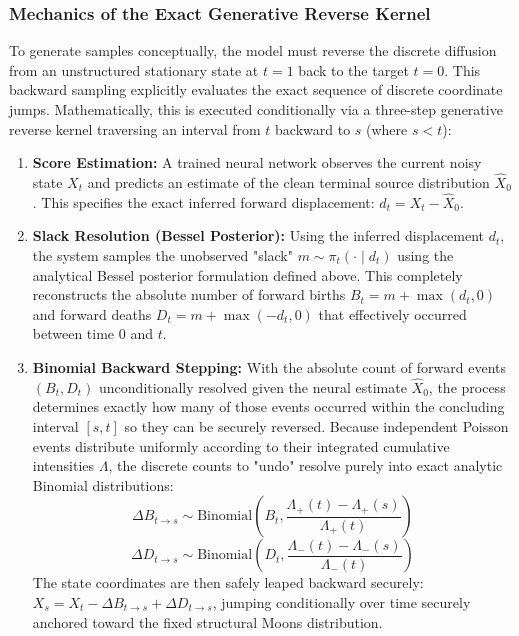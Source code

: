 \documentclass{article}
\begin{document}
\subsubsection*{Mechanics of the Exact Generative Reverse Kernel}
To generate samples conceptually, the model must reverse the discrete diffusion from an unstructured stationary state at \(t=1\) back to the target \(t=0\). This backward sampling explicitly evaluates the exact sequence of discrete coordinate jumps. Mathematically, this is executed conditionally via a three-step generative reverse kernel traversing an interval from \(t\) backward to \(s\) (where \(s < t\)):
\begin{enumerate}
    \item \textbf{Score Estimation:} A trained neural network observes the current noisy state \(X_t\) and predicts an estimate of the clean terminal source distribution \(\hat{X}_0\). This specifies the exact inferred forward displacement: \(d_t = X_t - \hat{X}_0\).
    \item \textbf{Slack Resolution (Bessel Posterior):} Using the inferred displacement \(d_t\), the system samples the unobserved "slack" \(m \sim \pi_t(\cdot \mid d_t)\) using the analytical Bessel posterior formulation defined above. This completely reconstructs the absolute number of forward births \(B_t = m + \max(d_t, 0)\) and forward deaths \(D_t = m + \max(-d_t, 0)\) that effectively occurred between time \(0\) and \(t\).
    \item \textbf{Binomial Backward Stepping:} With the absolute count of forward events \((B_t, D_t)\) unconditionally resolved given the neural estimate \(\hat{X}_0\), the process determines exactly how many of those events occurred within the concluding interval \([s, t]\) so they can be securely reversed. Because independent Poisson events distribute uniformly according to their integrated cumulative intensities \(\Lambda\), the discrete counts to "undo" resolve purely into exact analytic Binomial distributions:
    \[
    \Delta B_{t \to s} \sim \text{Binomial}\left(B_t, \frac{\Lambda_+(t) - \Lambda_+(s)}{\Lambda_+(t)}\right)
    \]
    \[
    \Delta D_{t \to s} \sim \text{Binomial}\left(D_t, \frac{\Lambda_-(t) - \Lambda_-(s)}{\Lambda_-(t)}\right)
    \]
    The state coordinates are then safely leaped backward securely: \(X_s = X_t - \Delta B_{t \to s} + \Delta D_{t \to s}\), jumping conditionally over time securely anchored toward the fixed structural Moons distribution.
\end{enumerate}
\end{document}
